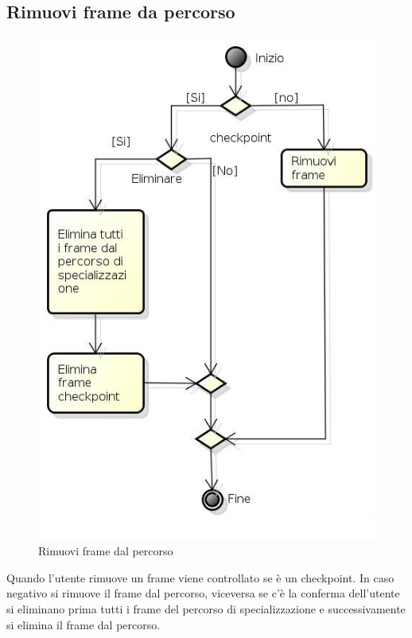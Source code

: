 \newpage

\subsection{Rimuovi frame da percorso}

\begin{figure}[h!]
		\centering
		\includegraphics[scale=.5]{img/attivita/Rimuovi_frame_da_percorso.jpg}
		\caption{Rimuovi frame dal percorso}
		\label{fig:Rimuovi_frame_da_percorso}
\end{figure}

Quando l'utente rimuove un frame viene controllato se è un checkpoint. In caso negativo si rimuove il frame dal percorso, viceversa se c'è la conferma dell'utente si eliminano prima tutti i frame del percorso di specializzazione e successivamente si elimina il frame dal percorso. 
